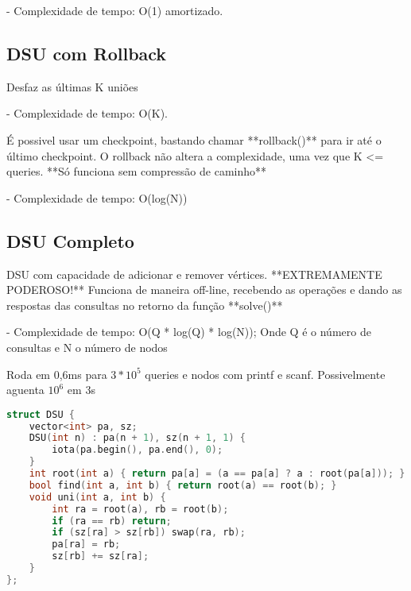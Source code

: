 \documentclass[11pt, a4paper, twoside]{article}
\begin{document}
- Complexidade de tempo: O(1) amortizado.

\subsection{DSU com Rollback}

Desfaz as últimas K uniões

- Complexidade de tempo: O(K).

É possivel usar um checkpoint, bastando chamar **rollback()** para ir até o último checkpoint.  
O rollback não altera a complexidade, uma vez que K <= queries.  
**Só funciona sem compressão de caminho**

- Complexidade de tempo: O(log(N))

\subsection{DSU Completo}

DSU com capacidade de adicionar e remover vértices.  
**EXTREMAMENTE PODEROSO!**  
Funciona de maneira off-line, recebendo as operações e dando as respostas das consultas no retorno da função **solve()**

- Complexidade de tempo: O(Q * log(Q) * log(N)); Onde Q é o número de consultas e N o número de nodos

Roda em 0,6ms para $3 * 10^5$ queries e nodos com printf e scanf.  
Possivelmente aguenta $10^6$ em 3s


\begin{lstlisting}[language=C++]
struct DSU {
    vector<int> pa, sz;
    DSU(int n) : pa(n + 1), sz(n + 1, 1) {
        iota(pa.begin(), pa.end(), 0);
    }
    int root(int a) { return pa[a] = (a == pa[a] ? a : root(pa[a])); }
    bool find(int a, int b) { return root(a) == root(b); }
    void uni(int a, int b) {
        int ra = root(a), rb = root(b);
        if (ra == rb) return;
        if (sz[ra] > sz[rb]) swap(ra, rb);
        pa[ra] = rb;
        sz[rb] += sz[ra];
    }
};
\end{lstlisting}
\end{document}
